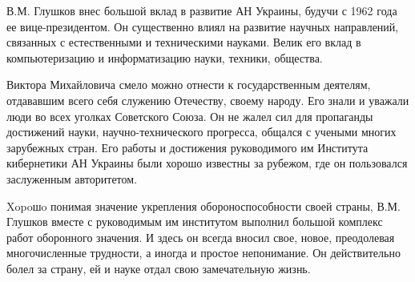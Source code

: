 В.М. Глушков внес большой вклад в развитие АН Украины, будучи с 1962 года ее
вице-президентом. Он существенно влиял на развитие научных направлений,
связанных с естественными и техническими науками. Велик его вклад в
компьютеризацию и информатизацию науки, техники, общества.

Виктора Михайловича смело можно отнести к государственным деятелям, отдававшим
всего себя служению Отечеству, своему народу. Его знали и уважали люди во всех
уголках Советского Союза. Он не жалел сил для пропаганды достижений науки,
научно-технического прогресса, общался с учеными многих зарубежных стран. Его
работы и достижения руководимого им Института кибернетики АН Украины были хорошо
известны за рубежом, где он пользовался заслуженным авторитетом.

Xopoшo понимая значение укрепления обороноспособности своей страны, В.М. Глушков
вместе с руководимым им институтом выполнил большой комплекс работ оборонного
значения. И здесь он всегда вносил свое, новое, преодолевая многочисленные
трудности, а иногда и простое непонимание. Он действительно болел за страну, ей
и науке отдал свою замечательную жизнь.

